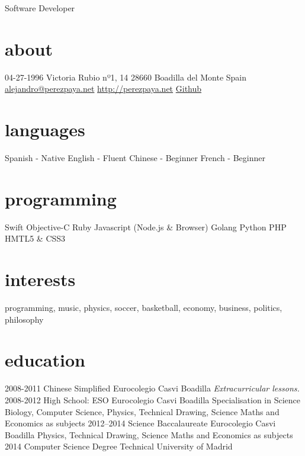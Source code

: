 \documentclass[]{perezpaya-cv}
\begin{document}
       {Software Developer}


\begin{aside}
  \section{about}
  	04-27-1996
    Victoria Rubio nº1, 14
    28660 Boadilla del Monte
    Spain
    ~
    \href{mailto:alejandro@perezpaya.net}{alejandro@perezpaya.net}
    \href{http://perezpaya.net}{http://perezpaya.net}
    \href{http://github.com/alexperezpaya}{Github}
  \section{languages}
    Spanish - Native
    English - Fluent
    Chinese - Beginner
    French  - Beginner
  \section{programming}
	Swift
    Objective-C
    Ruby
    Javascript
    (Node.js \& Browser)
    Golang
    Python
    PHP
    HMTL5 \& CSS3
\end{aside}

\section{interests}
programming, music, physics, soccer, basketball, economy, business, politics, philosophy

\section{education}

\begin{entrylist}
  \entry
    {2008-2011}
    {Chinese Simplified}
    {Eurocolegio Casvi Boadilla}
    {\emph{Extracurricular lessons.}}
  \entry
    {2008-2012}
    {High School: ESO}
    {Eurocolegio Casvi Boadilla}
    {Specialisation in Science\\
    Biology, Computer Science, Physics, Technical Drawing, Science Maths and Economics as subjects}
  \entry
    {2012–2014}
    {Science Baccalaureate}
    {Eurocolegio Casvi Boadilla}
    {Physics, Technical Drawing, Science Maths and Economics as subjects}
  \entry
    {2014}
    {Computer Science Degree}
    {Technical University of Madrid}
    {}
\end{entrylist}
\end{document}
